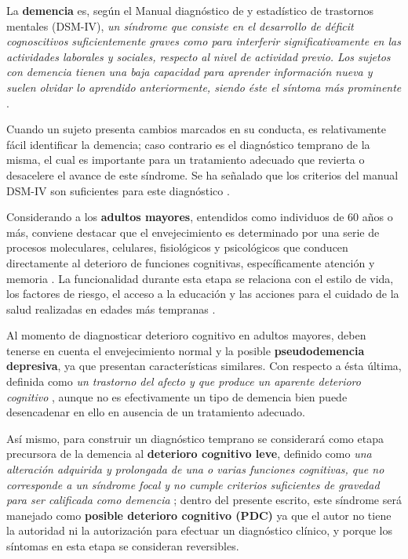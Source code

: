 La \textbf{demencia} es, según el Manual diagnóstico de y estadístico de trastornos mentales 
(DSM-IV), \textit{un síndrome que consiste en el desarrollo de déficit cognoscitivos 
suficientemente graves como para interferir significativamente en las actividades laborales y 
sociales, respecto al nivel de actividad previo. 
Los sujetos con demencia tienen una baja capacidad para aprender información nueva y suelen olvidar 
lo aprendido anteriormente, siendo éste el síntoma más prominente} \cite{DCM5}.

Cuando un sujeto presenta cambios marcados en su conducta, es relativamente fácil identificar la 
demencia; caso contrario es el diagnóstico temprano de la misma, el cual es importante para un 
tratamiento adecuado que revierta o desacelere el avance de este síndrome.
Se ha señalado que los criterios del manual DSM-IV son suficientes para este diagnóstico
\cite{Knopman01}.

Considerando a los \textbf{adultos mayores}, entendidos como individuos de 60 años o más, conviene 
destacar que el envejecimiento es determinado por una serie de procesos moleculares, celulares, 
fisiológicos y psicológicos que conducen directamente al deterioro de funciones cognitivas, 
específicamente atención y memoria \cite{Park09}.
La funcionalidad durante esta etapa se relaciona con el estilo de vida, los factores de riesgo, el 
acceso a la educación y las acciones para el cuidado de la salud realizadas en edades más 
tempranas \cite{Sanhueza14}.

Al momento de diagnosticar deterioro cognitivo en adultos mayores, deben tenerse en cuenta el 
envejecimiento normal y la posible \textbf{pseudodemencia depresiva}, ya que presentan 
características similares. Con respecto a ésta última, definida como \textit{un trastorno del 
afecto y que produce un aparente deterioro cognitivo} \cite{DCM5}, aunque no es efectivamente un 
tipo de demencia bien puede desencadenar en ello en ausencia de un tratamiento adecuado.

Así mismo, para construir un diagnóstico temprano
se considerará como etapa precursora de la demencia al \textbf{deterioro cognitivo 
leve}, definido como \textit{una alteración adquirida y prolongada de 
una o varias funciones cognitivas, que no corresponde a un síndrome focal y no cumple criterios 
suficientes de gravedad para ser calificada como demencia} \cite{Robles02};
dentro del presente escrito, este síndrome será manejado como \textbf{posible deterioro 
cognitivo (PDC)} ya que el autor no tiene la autoridad ni la autorización para efectuar un 
diagnóstico clínico, y porque los síntomas en esta etapa se consideran %
reversibles.

